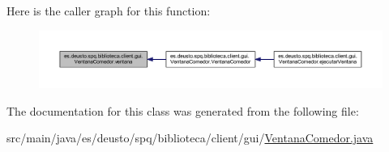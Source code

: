 Here is the caller graph for this function\+:
\nopagebreak
\begin{figure}[H]
\begin{center}
\leavevmode
\includegraphics[width=350pt]{classes_1_1deusto_1_1spq_1_1biblioteca_1_1client_1_1gui_1_1_ventana_comedor_a5fccdea48f9951fe483c0ace7ef475e0_icgraph}
\end{center}
\end{figure}


The documentation for this class was generated from the following file\+:\begin{DoxyCompactItemize}
\item 
src/main/java/es/deusto/spq/biblioteca/client/gui/\mbox{\hyperlink{_ventana_comedor_8java}{Ventana\+Comedor.\+java}}\end{DoxyCompactItemize}
